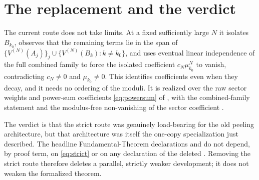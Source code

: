 \documentclass{article}
\begin{document}
\section{The replacement and the verdict}

The current route does not take limits. At a fixed sufficiently large $N$ it
isolates $B_{k_0}$, observes that the remaining terms lie in the span of
$\{V^{(N)}(A_j)\}_j \cup \{V^{(N)}(B_k) : k\neq k_0\}$, and uses eventual linear
independence of the full combined family to force the isolated coefficient
$c_N\mu_{k_0}^N$ to vanish, contradicting $c_N\neq 0$ and
$\mu_{k_0}\neq 0$. This identifies coefficients even when they decay, and it
needs no ordering of the moduli. It is realized over the raw sector weights and
power-sum coefficients \eqref{eq:powersum} of , with
the combined-family statement
 and the
modulus-free non-vanishing of the sector coefficient
.

The verdict is that the strict route was genuinely load-bearing for the old
peeling architecture, but that architecture was itself the one-copy specialization
just described. The headline Fundamental-Theorem declarations
 and
 do not depend, by
proof term, on \eqref{eq:strict} or on any declaration of the deleted
. Removing the strict route therefore
deletes a parallel, strictly weaker development; it does not weaken the formalized
theorem.



\end{document}
